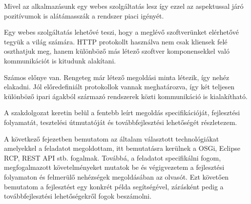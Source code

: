 Mivel az alkalmazásunk egy webes szolgáltatás lesz így ezzel az aspektussal járó pozitívumok is alátámasszák a rendszer piaci igényét.

Egy webes szolgáltatás lehetővé teszi, hogy a meglévő szoftverünket elérhetővé tegyük a világ számára\cite{tutorialspoint}. HTTP protokollt használva nem csak kliensek felé oszthatjuk meg, hanem különböző más létező szoftver komponensekkel való kommunikációt is kitudunk alakítani.

Számos előnye van. Rengeteg már létező megoldási minta létezik, így nehéz elakadni. Jól előredefiniált protokollok vannak meghatározva, így két teljesen különböző ipari ágakból származó rendszerek közti kommunikáció is kialakítható.


A szakdolgozat keretin belül a fentebb leírt megoldás specifikációját, fejlesztési folyamatát, tesztelési útmutatóját és továbbfejlesztési lehetőségét részletezem.

A következő fejezetben bemutatom az általam választott technológiákat amelyekkel a feladatot megoldottam, itt bemutatásra kerülnek a OSGi, Eclipse RCP, REST API stb. fogalmak. Továbbá, a feladatot specifikálni fogom, megfogalmazott követelményeket mutatok be és végigvezetem a fejlesztési folyamaton és felmerülő nehézségek megoldásában az olvasót. Ezt követően bemutatom a fejlesztést egy konkrét példa segítségével, zárásként pedig a továbbfejlesztési lehetőségekről fogok beszámolni.





















